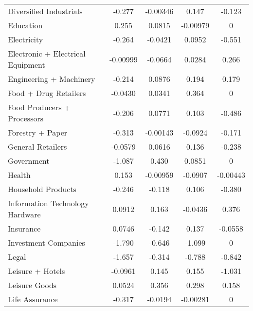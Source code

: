 {\begin{longtable}{l*{4}{c}}
Diversified Industrials&   -0.277\sym{*}  & -0.00346         &    0.147         &   -0.123         \\
Education       &    0.255         &   0.0815         & -0.00979         &        0         \\
Electricity     &   -0.264         &  -0.0421         &   0.0952         &   -0.551\sym{*}  \\
Electronic + Electrical Equipment& -0.00999         &  -0.0664         &   0.0284         &    0.266         \\
Engineering + Machinery&   -0.214         &   0.0876         &    0.194         &    0.179         \\
Food + Drug Retailers&  -0.0430         &   0.0341         &    0.364\sym{**} &        0         \\
Food Producers + Processors&   -0.206         &   0.0771         &    0.103         &   -0.486\sym{*}  \\
Forestry + Paper&   -0.313         & -0.00143         &  -0.0924         &   -0.171         \\
General Retailers&  -0.0579         &   0.0616         &    0.136         &   -0.238         \\
Government      &   -1.087\sym{***}&    0.430\sym{*}  &   0.0851         &        0         \\
Health          &    0.153         & -0.00959         &  -0.0907         & -0.00443         \\
Household Products&   -0.246         &   -0.118         &    0.106         &   -0.380         \\
Information Technology Hardware&   0.0912         &    0.163         &  -0.0436         &    0.376         \\
Insurance       &   0.0746         &   -0.142         &    0.137         &  -0.0558         \\
Investment Companies&   -1.790\sym{***}&   -0.646\sym{***}&   -1.099\sym{***}&        0         \\
Legal           &   -1.657\sym{***}&   -0.314         &   -0.788\sym{***}&   -0.842\sym{**} \\
Leisure + Hotels&  -0.0961         &    0.145         &    0.155         &   -1.031\sym{***}\\
Leisure Goods   &   0.0524         &    0.356\sym{*}  &    0.298\sym{*}  &    0.158         \\
Life Assurance  &   -0.317         &  -0.0194         & -0.00281         &        0         \\

\end{longtable}}
